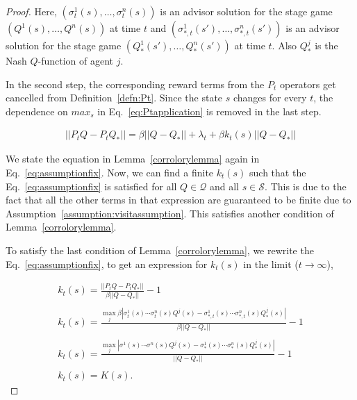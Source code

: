 \documentclass[jair, twoside,11pt,theapa]{article}
\begin{document}
\begin{proof}
\noindent Here, $(\sigma^1_t(s), \ldots, \sigma^n_t(s))$ is an advisor solution for the stage game $(Q^1(s), \ldots, Q^n(s))$ at time $t$ and  $(\sigma^1_{*,t}(s'), \ldots, \sigma^n_{*,t}(s'))$ is an advisor solution for the stage game $(Q^1_*(s'), \ldots, Q^n_*(s'))$ at time $t$. Also $Q_{*}^j$ is the Nash $Q$-function of agent $j$. 


In the second step, the corresponding reward terms from the $P_t$ operators get cancelled from Definition~\ref{defn:Pt}. Since the state $s$ changes for every $t$, the dependence on $max_s$ in Eq.~\ref{eq:Ptapplication} is removed in the last step. 

\begin{equation}\label{eq:assumptionfix}
    \begin{array}{l}
   || P_tQ  - P_t Q_{*} || = \beta ||Q - Q_{*} || + \lambda_t + \beta k_t(s)||Q - Q_{*} ||
    \end{array}
\end{equation}


We state the equation in Lemma~\ref{corrolorylemma} again in  Eq.~\ref{eq:assumptionfix}. Now, we can find a finite  $k_t(s)$ such that the Eq.~\ref{eq:assumptionfix} is satisfied for all $Q \in \mathcal{Q}$ and all $s \in \mathcal{S}$. This is due to the fact that all the other terms in that expression are guaranteed to be finite due to Assumption~\ref{assumption:visitassumption}. This satisfies another condition of Lemma~\ref{corrolorylemma}.   





To satisfy the last condition of Lemma~\ref{corrolorylemma}, we rewrite the Eq.~\ref{eq:assumptionfix}, to get an expression for $k_t(s)$ in the limit ($t \xrightarrow{} \infty$), 

\begin{equation}\label{eq:rewrite}
    \begin{array}{l}
   k_t(s) = \frac{||P_t Q  - P_t {Q_{*}}||}{\beta||Q - Q_{*}||} - 1 \\  \\
   k_t(s) = \frac{\max_j \beta | \sigma^1_t(s) \cdots \sigma^n_t(s) Q^j(s)  - \sigma^1_{*,t}(s) \cdots \sigma_{*,t}^n(s) Q_{*}^{j}(s) |}{\beta||Q - Q_{*}||} - 1
   \\ \\ 
   k_t(s) = \frac{\max_j | \sigma^1(s) \cdots \sigma^n(s) Q^j(s)  - \sigma^1_{*}(s) \cdots \sigma_{*}^n(s) Q_{*}^{j}(s) |}{||Q - Q_{*}||} - 1 
   \\ \\ 
   k_t(s) = K(s).
    \end{array}
\end{equation}



\end{proof}
\end{document}
